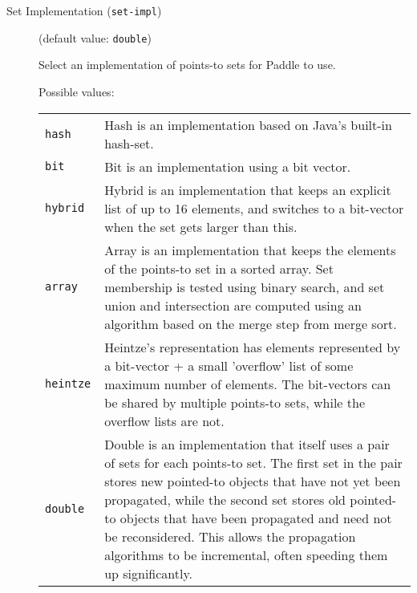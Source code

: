 \documentclass{article}
\begin{document}
\begin{description}
\begin{longtable}{p{1in}p{4in}}
\end{longtable}


\item[Set Implementation ({\tt set-impl})]
(default value: {\tt double})




Select an implementation of points-to sets for Paddle to use.




Possible values:\\
\begin{longtable}{p{1in}p{4in}}

{\tt hash }
&

Hash is an implementation based on Java's built-in hash-set.
\\

{\tt bit }
&

Bit is an implementation using a bit vector.
\\

{\tt hybrid }
&

Hybrid is an implementation that keeps an explicit list of up to
16 elements, and switches to a bit-vector when the set gets
larger than this.
\\

{\tt array }
&

Array is an implementation that keeps the elements of the
points-to set in a sorted array. Set membership is tested using
binary search, and set union and intersection are computed using
an algorithm based on the merge step from merge sort.
\\

{\tt heintze }
&
Heintze's representation has elements represented by a bit-vector + a small
									'overflow' list of some maximum number of elements.  The bit-vectors can be shared
									by multiple points-to sets, while the overflow lists are not.
								\\

{\tt double }
&

Double is an implementation that itself uses a pair of sets for
each points-to set. The first set in the pair stores new pointed-to
objects that have not yet been propagated, while the second set stores
old pointed-to objects that have been propagated and need not be
reconsidered. This allows the propagation algorithms to be incremental,
often speeding them up significantly.
\\

\end{longtable}



\end{description}
\end{document}
